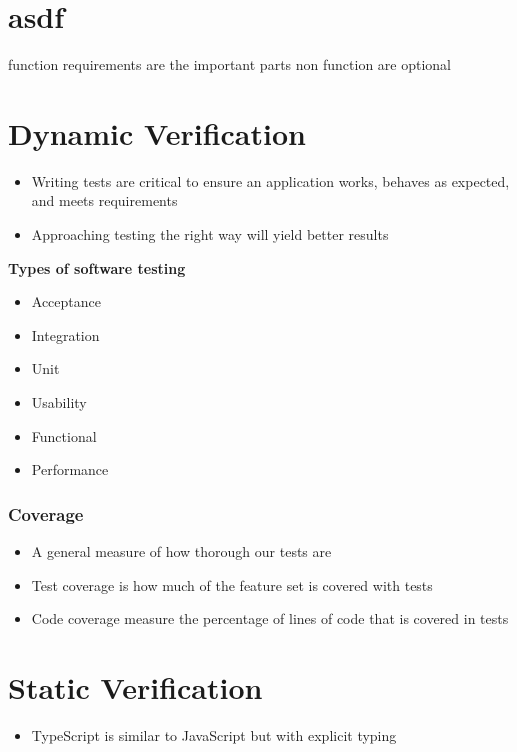 \documentclass{report}
\begin{document}
\chapter{asdf}
	function requirements are the important parts
	non function are optional

\chapter{Dynamic Verification}

	\begin{itemize}
		\item Writing tests are critical to ensure an application works, behaves as expected, and meets requirements
		\item Approaching testing the right way will yield better results
	\end{itemize}

	\textbf{Types of software testing}
	\begin{itemize}
		\item Acceptance
		\item Integration
		\item Unit
		\item Usability
		\item Functional
		\item Performance
	\end{itemize}

	\subsection{Coverage}
	\begin{itemize}
		\item A general measure of how thorough our tests are
		\item Test coverage is how much of the feature set is covered with tests
		\item Code coverage measure the percentage of lines of code that is covered in tests
	\end{itemize}

\chapter{Static Verification}

	\begin{itemize}
		\item TypeScript is similar to JavaScript but with explicit typing
	\end{itemize}
\end{document}
